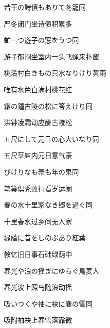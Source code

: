 \begin{haiku}
    {\FH 若干の詩債もありて冬籠}\hfill{\FH 同}

    {\FK 严冬闭门坐诗债积累多}
\end{haiku}

\begin{haiku}
    {\FH 虻一つ遊子の窓をうつ}\hfill{\FH 同}

    {\FK 游子郁闷坐室内一头飞蝇来扑窗}
\end{haiku}

\begin{haiku}
    {\FH 桃満村白きもの只水なりけり}\hfill{\FH 黄雨}

    {\FK 唯有水色白满村桃花红}
\end{haiku}

\begin{haiku}
    {\FH 霜の鐘古陵の松に答えけり}\hfill{\FH 同}

    {\FK 洪钟凌霜动应酬古陵松}
\end{haiku}

\begin{haiku}
    {\FH {}五尺にして元日の心大いなり}\hfill{\FH 同}

    {\FK 五尺草庐内元日意气豪}
\end{haiku}

\begin{haiku}
    {\FH {}びけりなも箒も年の果}\hfill{\FH 同}

    {\FK 笔箒倶秃败行看岁运阑}
\end{haiku}

\begin{haiku}
    {\FH 春の水十里家なき郷を過ぐ}\hfill{\FH 同}

    {\FK 十里春水过乡间无人家}
\end{haiku}

\begin{haiku}
    {\FH 縁蔭に昔をしのぶあり}\hfill{\FH 紅葉}

    {\FK 教忆旧日事石础绿荫中}
\end{haiku}

\begin{haiku}
    {\FH 春光や浪の揺ぎにゆらぐ鳥}\hfill{\FH 麦人}

    {\FK 春光波上照鸟随浪动摇}
\end{haiku}

\begin{haiku}
    {\FH 吸いつくや袖に袂に春の雪}\hfill{\FH 同}

    {\FK 吸附袖袂上春雪落霏微}
\end{haiku}

